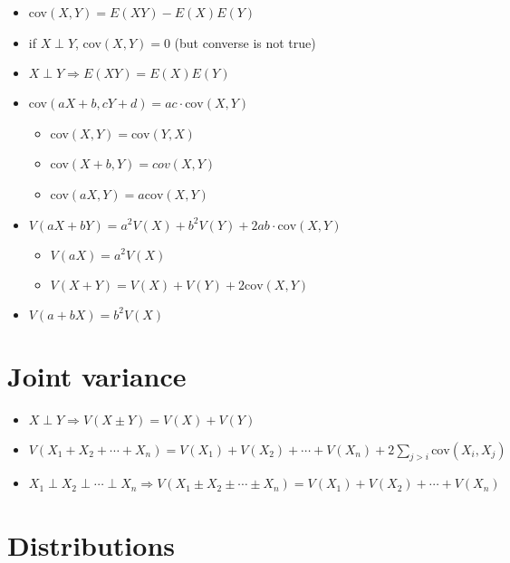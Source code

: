\documentclass[twocolumn, 8pt]{extarticle}
\begin{document}
\begin{itemize}
    \item cov$(X, Y) = E(XY) - E(X)E(Y)$
    \item if $X \perp Y$, cov$(X, Y) = 0$ (but converse is not true)
    \item $X \perp Y \Rightarrow E(XY) = E(X)E(Y)$
    \item cov$(aX + b, cY + d) = ac \cdot \text{cov}(X, Y)$
    \begin{itemize}
        \item cov$(X, Y) = \text{cov}(Y, X)$
        \item cov$(X + b, Y) = cov(X, Y)$
        \item cov$(aX, Y) = a \text{cov}(X, Y)$
    \end{itemize}
    \item $V(aX + bY) = a^2 V(X) + b^2 V(Y) + 2 ab \cdot \text{cov}(X, Y)$
    \begin{itemize}
        \item $V(aX) = a^2V(X)$
        \item $V(X + Y) = V(X) + V(Y) + 2 \text{cov}(X, Y)$
    \end{itemize}
    \item $V(a + bX) = b^2V(X)$
\end{itemize}

\section*{Joint variance}

\begin{itemize}
    \item $X \perp Y \Rightarrow V(X \pm Y) = V(X) + V(Y)$
    \item $V(X_1 + X_2 + \cdots + X_n) = V(X_1) + V(X_2) + \cdots + V(X_n) + 2 \sum_{j > i}\text{cov}(X_i, X_j)$
    \item $X_1 \perp X_2 \perp \cdots \perp X_n \Rightarrow V(X_1 \pm X_2 \pm \cdots \pm X_n) = V(X_1) + V(X_2) + \cdots + V(X_n)$
\end{itemize}

\section*{Distributions}
\end{document}
